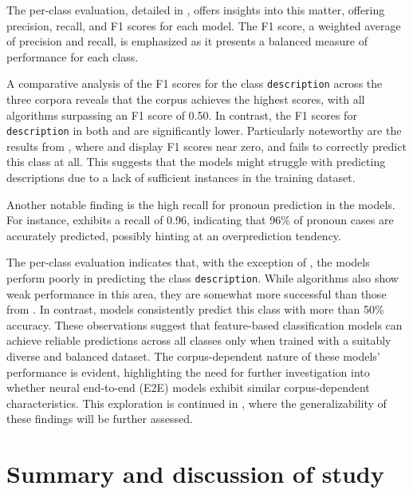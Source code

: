 The per-class evaluation, detailed in , offers insights into this matter, offering precision, recall, and F1 scores for each model. The F1 score, a weighted average of precision and recall, is emphasized as it presents a balanced measure of performance for each class.



A comparative analysis of the F1 scores for the class \texttt{description} across the three corpora reveals that the \wsj corpus achieves the highest scores, with all algorithms surpassing an F1 score of 0.50. In contrast, the F1 scores for \texttt{description} in both \msrcor and \negcor are significantly lower. Particularly noteworthy are the results from \negcor, where  and  display F1 scores near zero, and  fails to correctly predict this class at all. This suggests that the \negcor models might struggle with predicting descriptions due to a lack of sufficient instances in the training dataset.

Another notable finding is the high recall for pronoun prediction in the \negcor models. For instance,  exhibits a recall of 0.96, indicating that 96\% of pronoun cases are accurately predicted, possibly hinting at an overprediction tendency.

The per-class evaluation indicates that, with the exception of , the \negcor models perform poorly in predicting the class \texttt{description}. While \msrcor algorithms also show weak performance in this area, they are somewhat more successful than those from \negcor. In contrast, \wsj models consistently predict this class with more than 50\% accuracy. These observations suggest that feature-based classification models can achieve reliable predictions across all classes only when trained with a suitably diverse and balanced dataset. The corpus-dependent nature of these models' performance is evident, highlighting the need for further investigation into whether neural end-to-end (E2E) models exhibit similar corpus-dependent characteristics. This exploration is continued in , where the generalizability of these findings will be further assessed.

\section{Summary and discussion of study \studA}\label{sec:discussionstudya}

